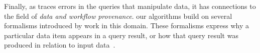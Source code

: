 Finally, as \sys traces errors in the queries that manipulate data, it
has connections to the field of \emph{data and workflow provenance}.
our algorithms build on several formalisms introduced by work in this
domain. These formalisms express why a particular data item appears in
a query result, or how that query result was produced in relation to
input data~\cite{BunemanKT01,GKT07-semirings, CheneyCT09, CuiWW00
}.


% 
% 
% 
% 
% 
% 
% 
% 
% 
% 
% 
% 
% 
% 
% 
